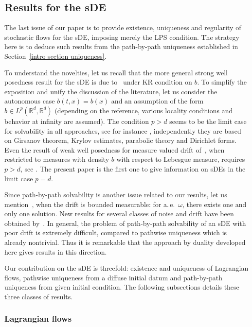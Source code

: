 \documentclass[a4paper,10pt]{article}
\begin{document}
\subsection{Results for the sDE\label{intro section SDE}}

The last issue of our paper is to provide existence, uniqueness and regularity of
stochastic flows for the sDE, imposing merely the LPS condition. The
strategy here is to deduce such results from the path-by-path uniqueness
established in Section~\ref{intro section uniqueness}.

To understand the novelties, let us recall that the more general strong well
posedness result for the sDE is due to~\cite{KRYROE05} under KR condition on $b$. 
To simplify the exposition and unify the discussion of the literature, let
us consider the autonomous case $b( t,x) =b( x) $ and an assumption of the form 
$b\in L^{p}( \mathbb{R}^{d},\mathbb{R}^{d}) $ (depending on the reference, various locality conditions and
behavior at infinity are assumed). The condition $p>d$ seems to be the
limit case for solvability in all approaches, see for instance \cite{KRYROE05,GYOMAR01,Po,ChZh,St}, independently they are based
on Girsanov theorem, Krylov estimates, parabolic theory and Dirichlet forms.
Even the result of weak well posedness for measure valued drift of~\cite{BASCHE03}, when restricted to measures with density $b$ with respect to
Lebesgue measure, requires $p>d$, see \cite[Example 2.3]{BASCHE03}. The present
paper is the first one to give information on sDEs in the limit case $p=d$.

Since path-by-path solvability is another issue related to our results, let
us mention~\cite{DAVIE07}, when the drift is bounded measurable: for a.\,e.\ $\omega 
$, there exists one and only one solution. New results for several classes
of noise and drift have been obtained by~\cite{CATGUB13}. In general, the problem of path-by-path solvability
of an sDE with poor drift is extremely difficult, compared to pathwise
uniqueness which is already nontrivial. Thus it is remarkable that the
approach by duality developed here gives results in this direction.

Our contribution on the sDE is threefold: existence and uniqueness of Lagrangian flows, pathwise uniqueness from a diffuse initial datum and path-by-path uniqueness from given initial
condition. The following subsections details these three classes of results. 

\subsubsection{Lagrangian flows}
\end{document}
